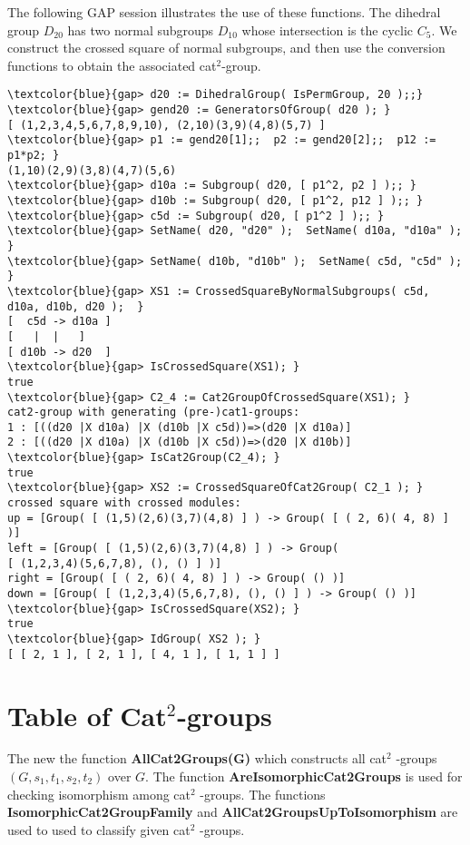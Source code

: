 \documentclass[a4paper,11pt]{article}
\theoremstyle{plain}
\theoremstyle{definition}
\begin{document}
The following \textsf{GAP} session illustrates the use of these functions.
The dihedral group $D_{20}$ has two normal subgroups $D_{10}$ 
whose intersection is the cyclic $C_5$.  
We construct the crossed square of normal subgroups, 
and then use the conversion functions to obtain the associated cat$^{2}$-group.

\begin{Verbatim}[frame=single, fontsize=\small, commandchars=\\\{\}]
\textcolor{blue}{gap> d20 := DihedralGroup( IsPermGroup, 20 );;}
\textcolor{blue}{gap> gend20 := GeneratorsOfGroup( d20 ); }
[ (1,2,3,4,5,6,7,8,9,10), (2,10)(3,9)(4,8)(5,7) ]
\textcolor{blue}{gap> p1 := gend20[1];;  p2 := gend20[2];;  p12 := p1*p2; }
(1,10)(2,9)(3,8)(4,7)(5,6)
\textcolor{blue}{gap> d10a := Subgroup( d20, [ p1^2, p2 ] );; }
\textcolor{blue}{gap> d10b := Subgroup( d20, [ p1^2, p12 ] );; }
\textcolor{blue}{gap> c5d := Subgroup( d20, [ p1^2 ] );; }
\textcolor{blue}{gap> SetName( d20, "d20" );  SetName( d10a, "d10a" ); }
\textcolor{blue}{gap> SetName( d10b, "d10b" );  SetName( c5d, "c5d" );  }
\textcolor{blue}{gap> XS1 := CrossedSquareByNormalSubgroups( c5d, d10a, d10b, d20 );  }
[  c5d -> d10a ]
[   |  |   ]
[ d10b -> d20  ]
\textcolor{blue}{gap> IsCrossedSquare(XS1); }
true
\textcolor{blue}{gap> C2_4 := Cat2GroupOfCrossedSquare(XS1); }
cat2-group with generating (pre-)cat1-groups:
1 : [((d20 |X d10a) |X (d10b |X c5d))=>(d20 |X d10a)]
2 : [((d20 |X d10a) |X (d10b |X c5d))=>(d20 |X d10b)]
\textcolor{blue}{gap> IsCat2Group(C2_4); }
true
\textcolor{blue}{gap> XS2 := CrossedSquareOfCat2Group( C2_1 ); }
crossed square with crossed modules:
up = [Group( [ (1,5)(2,6)(3,7)(4,8) ] ) -> Group( [ ( 2, 6)( 4, 8) ] )]
left = [Group( [ (1,5)(2,6)(3,7)(4,8) ] ) -> Group(
[ (1,2,3,4)(5,6,7,8), (), () ] )]
right = [Group( [ ( 2, 6)( 4, 8) ] ) -> Group( () )]
down = [Group( [ (1,2,3,4)(5,6,7,8), (), () ] ) -> Group( () )]
\textcolor{blue}{gap> IsCrossedSquare(XS2); }
true
\textcolor{blue}{gap> IdGroup( XS2 ); }
[ [ 2, 1 ], [ 2, 1 ], [ 4, 1 ], [ 1, 1 ] ]
\end{Verbatim}

\section{Table of Cat$^{2}$-groups}

The new the function \textbf{AllCat2Groups(G)} which constructs all cat$^{2}$%
-groups $(G,s_1,t_1,s_2,t_2)$ over $G$. The function \textbf{%
	AreIsomorphicCat2Groups} is used for checking isomorphism among cat$^{2}$%
-groups. The functions \textbf{IsomorphicCat2GroupFamily} and \textbf{%
	AllCat2GroupsUpToIsomorphism} are used to used to classify given cat$^{2}$%
-groups.
\end{document}
